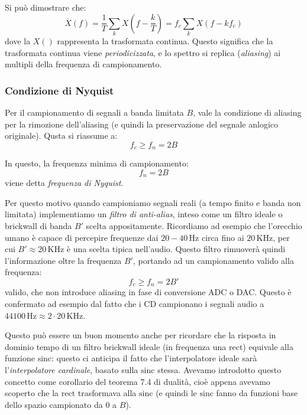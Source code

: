 \documentclass[a4paper,11pt]{article}
\begin{document}
Si può dimostrare che:
$$
\overline{X}(f) = \frac{1}{T} \sum_k X \left( f - \frac{k}{T} \right) = f_c \sum_k X(f - k f_c)
$$
dove la $X()$ rappresenta la trasformata continua. Questo significa che la trasformata continua viene \textit{periodicizzata}, e lo spettro si replica (\textit{aliasing}) ai multipli della frequenza di campionamento.

\subsubsection{Condizione di Nyquist}
Per il campionamento di segnali a banda limitata $B$, vale la condizione di aliasing per la rimozione dell'aliasing (e quindi la preservazione del segnale anlogico originale). Qusta si riassume a:
$$
f_c \geq f_n = 2B
$$

In questo, la frequenza minima di campionamento:
$$
f_n = 2B
$$
viene detta \textit{frequenza di Nyquist}.

Per questo motivo quando campioniamo segnali reali (a tempo finito e banda non limitata) implementiamo un \textit{filtro di anti-alias}, inteso come un filtro ideale o brickwall di banda $B'$ scelta appositamente.
Ricordiamo ad esempio che l'orecchio umano è capace di percepire frequenze dai $20-40 \, \mathrm{Hz}$ circa fino ai $20 \, \mathrm{KHz}$, per cui $B' \approx 20 \, \mathrm{KHz}$ è una scelta tipica nell'audio.
Questo filtro rimuoverà quindi l'informazione oltre la frequenza $B'$, portando ad un campionamento valido alla frequenza:
$$
f_c \geq f_n = 2B'
$$
valido, che non introduce aliasing in fase di conversione ADC o DAC. Questo è confermato ad esempio dal fatto che i CD campionano i segnali audio a $44100 \, \mathrm{Hz} \approx 2 \cdot 20 \, \mathrm{KHz}$. 

Questo può essere un buon momento anche per ricordare che la risposta in dominio tempo di un filtro brickwall ideale (in frequenza una $\mathrm{rect}$) equivale alla funzione $\mathrm{sinc}$: questo ci anticipa il fatto che l'interpolatore ideale sarà l'\textit{interpolatore cardinale}, basato sulla $\mathrm{sinc}$ stessa. Avevamo introdotto questo concetto come corollario del teorema 7.4 di dualità, cioè appena avevamo scoperto che la $\mathrm{rect}$ trasformava alla $\mathrm{sinc}$ (e quindi le $\mathrm{sinc}$ fanno da funzioni base dello spazio campionato da $0$ a $B$). 
\end{document}
